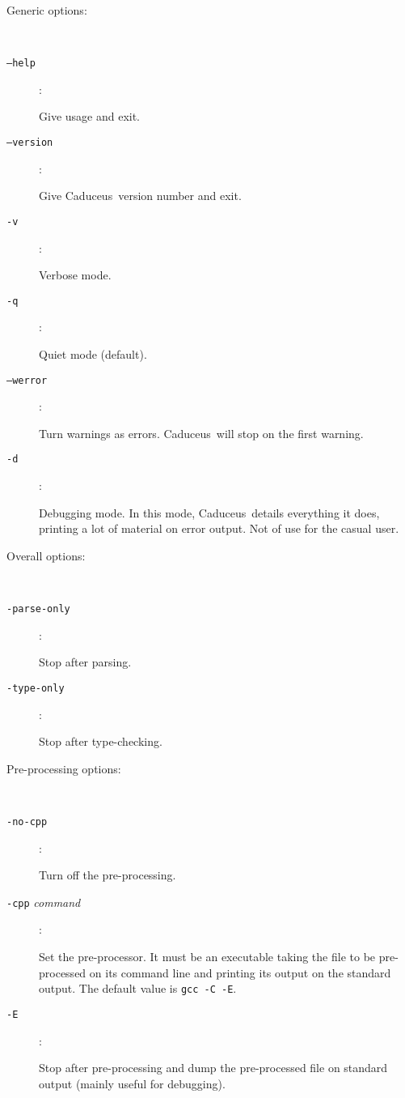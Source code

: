 \documentclass[a4paper,12pt]{report}
\newcommand{\caduceus}{\textsf{Caduceus}}
\begin{document}
\begin{description}
  \item[Generic options:] ~\par
  \item[\texttt{--help}]: ~\par    
    Give usage and exit. 
  \item[\texttt{--version}]: ~\par    
    Give \caduceus\ version number and exit. 
  \item[\texttt{-v}]: ~\par 
    Verbose mode. 
  \item[\texttt{-q}]: ~\par  
    Quiet mode (default).
  \item[\texttt{--werror}]: ~\par 
    Turn warnings as errors. \caduceus\ will stop on the first warning.
  \item[\texttt{-d}]: ~\par 
    Debugging mode. In this mode, \caduceus\ details everything it does,
    printing a lot of material on error output. Not of use for the
    casual user.

  \item[Overall options:] ~\par
  \item[\texttt{-parse-only}]: ~\par  
    Stop after parsing.
  \item[\texttt{-type-only}]: ~\par  
    Stop after type-checking.

  \item[Pre-processing options:] ~\par
  \item[\texttt{-no-cpp}]: ~\par  
    Turn off the pre-processing.
  \item[\texttt{-cpp} \textit{command}]: ~\par  
    Set the pre-processor. It must be an executable taking the file
    to be pre-processed on its command line and printing its output
    on the standard output. 
    The default value is \texttt{gcc -C -E}.
  \item[\texttt{-E}]: ~\par  
    Stop after pre-processing and dump the pre-processed file on
    standard output (mainly useful for debugging).

\end{description}
\end{document}
